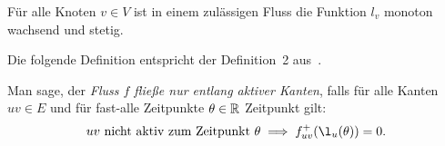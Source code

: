 \begin{lemma}
	Für alle Knoten $v\in V$ ist in einem zulässigen Fluss die Funktion $l_v$ monoton wachsend und stetig.
\end{lemma}

Die folgende Definition entspricht der Definition~2 aus~\cite{Koch2011}.

\begin{definition}
	Man sage, der \emph{Fluss $f$ fließe nur entlang aktiver Kanten}, falls für alle Kanten $uv\in E$ und für fast-alle Zeitpunkte $\theta\in\mathbb{R}$ Zeitpunkt gilt: $$ uv \text{ nicht aktiv zum Zeitpunkt } \theta \implies f_{uv}^+(\l_u(\theta)) = 0.$$
\end{definition}


